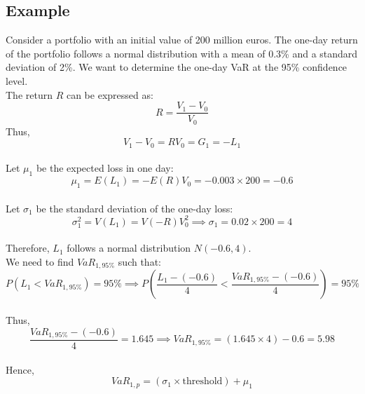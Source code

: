 \documentclass[a4paper,10pt]{article}
\begin{document}
\subsection{Example}

\noindent Consider a portfolio with an initial value of 200 million euros. The one-day return of the portfolio follows a normal distribution with a mean of 0.3\% and a standard deviation of 2\%. We want to determine the one-day VaR at the 95\% confidence level.\\

\noindent The return \(R\) can be expressed as: \\
\noindent \[R = \frac{V_1 - V_0}{V_0}\] Thus, \[V_1 - V_0 = RV_0 = G_1 = -L_1\]\\

\noindent Let \(\mu_1\) be the expected loss in one day:\\
\noindent \[\mu_1 = E(L_1) = -E(R)V_0 = -0.003 \times 200 = -0.6\]\\

\noindent Let \(\sigma_1\) be the standard deviation of the one-day loss:\\
\noindent \[\sigma_1^2 = V(L_1) = V(-R)V_0^2 \implies \sigma_1 = 0.02 \times 200 = 4\]\\

\noindent Therefore, \(L_1\) follows a normal distribution \(N(-0.6, 4)\).\\

\noindent We need to find \(VaR_{1,95\%}\) such that:\\
\noindent \[P(L_1 < VaR_{1,95\%}) = 95\% \implies P\left( \frac{L_1 - (-0.6)}{4} < \frac{VaR_{1,95\%} - (-0.6)}{4} \right) = 95\%\]\\

\noindent Thus,\\
\noindent \[\frac{VaR_{1,95\%} - (-0.6)}{4} = 1.645 \implies VaR_{1,95\%} = (1.645 \times 4) - 0.6 = 5.98\]\\

\noindent Hence,\\
\noindent \[VaR_{1,p} = (\sigma_1 \times \text{threshold}) + \mu_1\]\\
\end{document}
